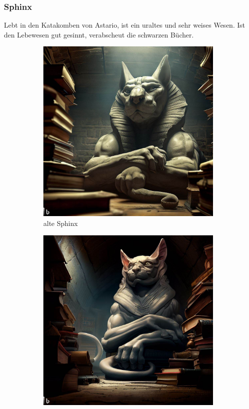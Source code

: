 \documentclass[11pt, twoside]{article}
\begin{document}
\subsubsection{Sphinx\label{sphinx}}
\label{sec:org2762b28}
Lebt in den Katakomben von Astario, ist ein uraltes und sehr weises Wesen. Ist den Lebewesen gut gesinnt, verabscheut die schwarzen Bücher.
\begin{figure}[H]
\centering
\caption{Sphinx}
\label{fig:sphinx}
  \begin{subfigure}{0.3\textwidth}
    \centering
    \includegraphics[width=0.99\linewidth]{sphinx1.jpeg}
    \caption{alte Sphinx}
  \end{subfigure}%
  \begin{subfigure}{0.3\textwidth}
    \centering
    \includegraphics[width=0.99\linewidth]{sphinx2.jpeg}

\end{subfigure}
\end{figure}
\end{document}
